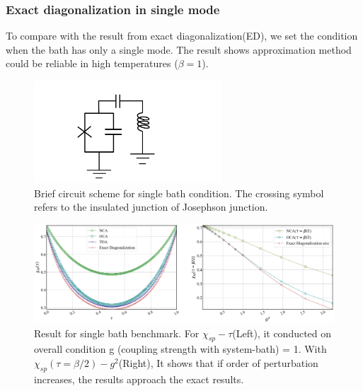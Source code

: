 \documentclass{article}[12pt]
\begin{document}
\begin{spacing}{1.5}
\subsubsection*{Exact diagonalization in single mode}
To compare with the result from exact diagonalization(ED), we set the condition when the bath has only a single mode. 
The result shows approximation method could be reliable in high temperatures ($\beta = 1$).
\begin{figure}[htbp]
  \centerline{\includegraphics[width=7cm]{TexFigure/kps_singlebath.png}}
  \caption{Brief circuit scheme for single bath condition. The crossing symbol  refers to the insulated junction of Josephson junction.}
\end{figure}
\begin{figure}[htbp]
  \centerline{\includegraphics[width=15cm]{TexFigure/bench_single_two.png}}
  \caption{Result for single bath benchmark. For $\chi_{sp} - \tau$(Left), it conducted on overall condition g (coupling strength with system-bath) = 1.
  With $\chi_{sp}(\tau=\beta/2)-g^2$(Right), It shows that if order of perturbation increases, the results approach the exact results.}
\end{figure}

\end{spacing}
\end{document}

